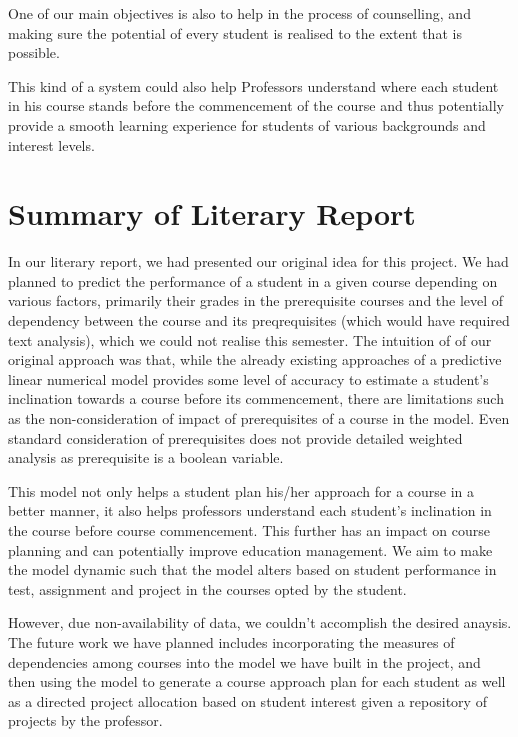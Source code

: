 \documentclass[conference]{IEEEtran}
\begin{document}
One of our main objectives is also to help in the process of counselling, and making sure the potential of every student is realised to the extent that is possible. 

This kind of a system could also help Professors understand where each student in his course stands before the commencement of the course and thus potentially provide a smooth learning experience for students of various backgrounds and interest levels.


	\section{Summary of Literary Report}

In our literary report, we had presented our original idea for this project. We had planned to predict the performance of a student in a given course depending on various factors, primarily their grades in the prerequisite courses and the level of dependency between the course and its preqrequisites (which would have required text analysis), which we could not realise this semester.
The intuition of of our original approach was that, 
while the already existing approaches of a predictive linear numerical model provides some level of accuracy to estimate a student's inclination towards a course before its commencement, there are limitations such as the non-consideration of impact of prerequisites of a course in the model. Even standard consideration of prerequisites does not provide detailed weighted analysis as prerequisite is a boolean variable.

This model not only helps a student plan his/her approach for a course in a better manner, it also helps professors understand each student's inclination in the course before course commencement. This further has an impact on course planning and can potentially improve education management. We aim to make the model dynamic such that the model alters based on student performance in test, assignment and project in the courses opted by the student.

However, due non-availability of data, we couldn't accomplish the desired anaysis. The future work we have planned includes incorporating the measures of dependencies among courses into the model we have built in the project, and then using the model to generate a course approach plan for each student as well as a directed project allocation based on student interest given a repository of projects by the professor.
\end{document}
